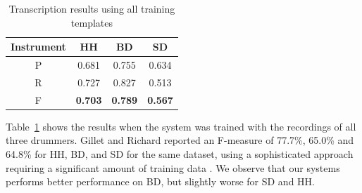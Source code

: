 \documentclass[a4paper]{article}
\newcommand{\tabref}[1]{\mbox{Table~\ref{#1}}}
\begin{document}
\begin{table}[ht]
\begin{footnotesize}
\begin{center}
\begin{tabular}{|c|c|c|c|}
\hline
Instrument & HH             & BD             & SD             \\ \hline
P          & 0.681          & 0.755          & 0.634          \\ \hline
R          & 0.727          & 0.827          & 0.513          \\ \hline
F          & \textbf{0.703} & \textbf{0.789} & \textbf{0.567} \\ \hline
\end{tabular}
\end{center}
\caption{Transcription results using all training templates}
\label{tab:basicResults}
\end{footnotesize}
\end{table}
  
\tabref{tab:basicResults} shows the results when the system was trained with the recordings of all three drummers.
Gillet and Richard reported an F-measure of 77.7\%, 65.0\% and 64.8\% for HH, BD, and SD for the same dataset, using a sophisticated approach requiring a significant amount of training data \cite{gillet_transcription_2008}. We observe that our systems performs better performance on BD, but slightly worse for SD and HH. 
\end{document}
